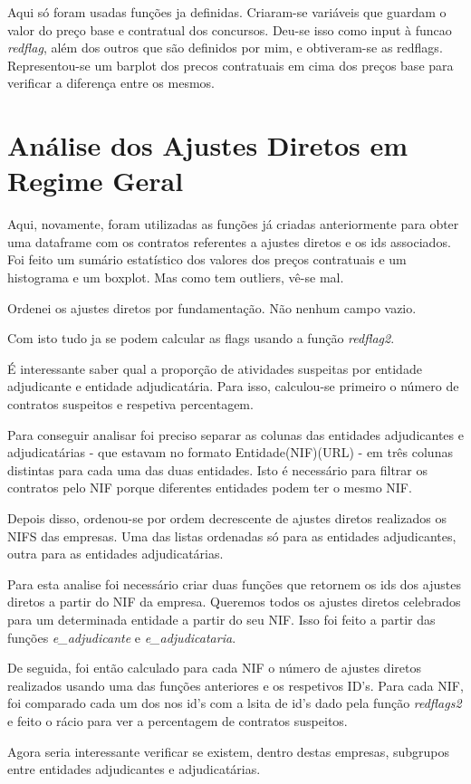 Aqui só foram usadas funções ja definidas. Criaram-se variáveis que guardam o valor do preço base e contratual dos concursos. Deu-se isso como input à funcao \textit{redflag}, além dos outros que são definidos por mim, e obtiveram-se as redflags. Representou-se um barplot dos precos contratuais em cima dos preços base para verificar a diferença entre os mesmos. 


\section{Análise dos Ajustes Diretos em Regime Geral}

Aqui, novamente, foram utilizadas as funções já criadas anteriormente para obter uma dataframe com os contratos referentes a ajustes diretos e os ids associados. Foi feito um sumário estatístico dos valores dos preços contratuais e um histograma e um boxplot. Mas como tem outliers, vê-se mal. 

Ordenei os ajustes diretos por fundamentação. Não nenhum campo vazio. 

Com isto tudo ja se podem calcular as flags usando a função \textit{redflag2}. 

É interessante saber qual a proporção de atividades suspeitas por entidade adjudicante e entidade adjudicatária. Para isso, calculou-se primeiro o número de contratos suspeitos e respetiva percentagem. 

Para conseguir analisar foi preciso separar as colunas das entidades adjudicantes e adjudicatárias - que estavam no formato Entidade(NIF)(URL) - em três colunas distintas para cada uma das duas entidades. Isto é necessário para filtrar os contratos pelo NIF porque diferentes entidades podem ter o mesmo NIF. 

Depois disso, ordenou-se por ordem decrescente de ajustes diretos realizados os NIFS das empresas. Uma das listas ordenadas só para as entidades adjudicantes, outra para as entidades adjudicatárias. 

Para esta analise foi necessário criar duas funções que retornem os ids dos ajustes diretos a partir do NIF da empresa. Queremos todos os ajustes diretos celebrados para um determinada entidade a partir do seu NIF. Isso foi feito a partir das funções \textit{e\_adjudicante} e \textit{e\_adjudicataria}. 

De seguida, foi então calculado para cada NIF o número de ajustes diretos realizados usando uma das funções anteriores e os respetivos ID's. Para cada NIF, foi comparado cada um dos nos id's com a lsita de id's dado pela função \textit{redflags2} e feito o rácio para ver a percentagem de contratos suspeitos. 

Agora seria interessante verificar se existem, dentro destas empresas, subgrupos entre entidades adjudicantes e adjudicatárias. 





























